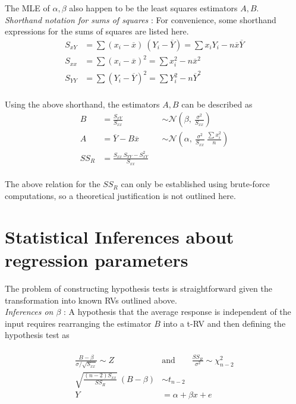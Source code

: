 The MLE of $ \alpha, \beta $ also happen to be the least squares estimators $ A, B $.\\

\textit{Shorthand notation for sums of squares} : For convenience, some shorthand expressions for the sums of squares are listed here.\\

\begin{align}
	S_{xY} &= \sum (x_i - \overline{x})\ (Y_i - \overline{Y}) = \sum x_i Y_i - n \overline{x} \overline{Y} \\
	S_{xx} &= \sum (x_i - \overline{x})^2 = \sum x_i^2 - n\overline{x}^2 \\
	S_{YY} &= \sum (Y_i - \overline{Y})^2 = \sum Y_i^2 - n\overline{Y}^2
\end{align}\\

Using the above shorthand, the estimators $ A, B $ can be described as \\

\begin{align}
	B &= \frac{S_{xY}}{S_{xx}} &&\sim \mathcal{N}\left( \beta,\ \frac{\sigma^2}{S_{xx}} \right) \\
	A &= \overline{Y} - B\overline{x} &&\sim  \mathcal{N}\left( \alpha,\ \frac{\sigma^2}{S_{xx}}\ \frac{\sum x_i^2}{n} \right) \\
	SS_R &= \frac{S_{xx}\ S_{YY} - S_{xY}^2}{S_{xx}}
\end{align} \\

The above relation for the $ SS_R $ can only be established using brute-force computations, so a theoretical justification is not outlined here.\\

\section{Statistical Inferences about regression parameters}

The problem of constructing hypothesis tests is straightforward given the transformation into known RVs outlined above. \\

\textit{Inferences on $ \beta $} : A hypothesis that the average response is independent of the input requires rearranging the estimator $ B $ into a t-RV and then defining the hypothesis test as\\
\\
\begin{align}
	\frac{B - \beta}{\sigma/\sqrt{S_{xx}}} \sim Z \qquad &\text{and} \qquad \frac{SS_R}{\sigma^2} \sim \chi^2_{n-2} \nonumber \\
	\sqrt{\frac{(n-2) S_{xx}}{SS_R}}\ (B - \beta) &\sim t_{n-2} \\
	Y &= \alpha + \beta x + e \nonumber
\end{align}\\

